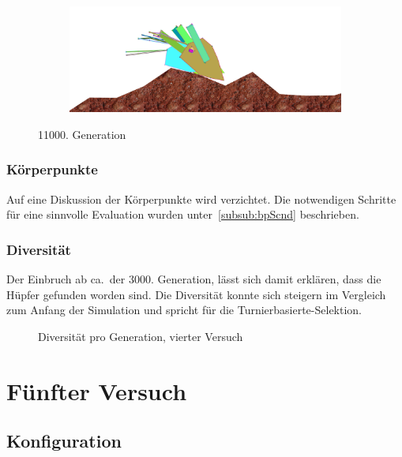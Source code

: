 \begin{figure}[H]
\begin{subfigure}[b]{0.45\textwidth}
            \includegraphics[width=\linewidth,center]{graphics/simulation-results/4_gen11000_4}
            \caption{\label{fig:gen11000_4}}
          \end{subfigure}
          \caption{11000. Generation\label{fig:gen11000}}
        \end{figure}

      \subsubsection{Körperpunkte}

        Auf eine Diskussion der Körperpunkte wird verzichtet.
        Die notwendigen Schritte für eine sinnvolle Evaluation wurden unter~\vref{subsub:bpScnd} beschrieben.

      \subsubsection{Diversität}

        Der Einbruch ab ca.\ der 3000. Generation, lässt sich damit erklären, dass die Hüpfer gefunden worden sind.
        Die Diversität konnte sich steigern im Vergleich zum Anfang der Simulation und spricht für die Turnierbasierte-Selektion.

        \begin{figure}[H]
          \centering
          
          \caption{Diversität pro Generation, vierter Versuch\label{fig:graphDivFourth}}
        \end{figure}

  \section{Fünfter Versuch}

    \subsection{Konfiguration}

